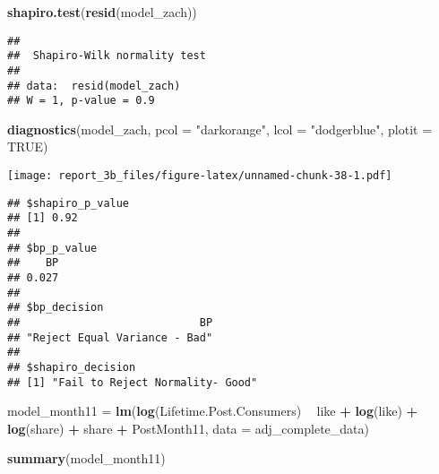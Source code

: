 \documentclass[
]{article}
\newenvironment{Shaded}{\begin{snugshade}}{\end{snugshade}}
\newcommand{\DataTypeTok}[1]{\textcolor[rgb]{0.13,0.29,0.53}{#1}}
\newcommand{\KeywordTok}[1]{\textcolor[rgb]{0.13,0.29,0.53}{\textbf{#1}}}
\newcommand{\NormalTok}[1]{#1}
\newcommand{\OperatorTok}[1]{\textcolor[rgb]{0.81,0.36,0.00}{\textbf{#1}}}
\newcommand{\OtherTok}[1]{\textcolor[rgb]{0.56,0.35,0.01}{#1}}
\newcommand{\StringTok}[1]{\textcolor[rgb]{0.31,0.60,0.02}{#1}}
\begin{document}
\begin{Shaded}
\begin{Highlighting}[]
\KeywordTok{shapiro.test}\NormalTok{(}\KeywordTok{resid}\NormalTok{(model_zach))}
\end{Highlighting}
\end{Shaded}

\begin{verbatim}
## 
##  Shapiro-Wilk normality test
## 
## data:  resid(model_zach)
## W = 1, p-value = 0.9
\end{verbatim}

\begin{Shaded}
\begin{Highlighting}[]
\KeywordTok{diagnostics}\NormalTok{(model_zach, }\DataTypeTok{pcol =} \StringTok{"darkorange"}\NormalTok{, }\DataTypeTok{lcol =} \StringTok{"dodgerblue"}\NormalTok{, }\DataTypeTok{plotit =} \OtherTok{TRUE}\NormalTok{)}
\end{Highlighting}
\end{Shaded}

\texttt{[image: report\_3b\_files/figure-latex/unnamed-chunk-38-1.pdf]}

\begin{verbatim}
## $shapiro_p_value
## [1] 0.92
## 
## $bp_p_value
##    BP 
## 0.027 
## 
## $bp_decision
##                            BP 
## "Reject Equal Variance - Bad" 
## 
## $shapiro_decision
## [1] "Fail to Reject Normality- Good"
\end{verbatim}

\begin{Shaded}
\begin{Highlighting}[]
\NormalTok{model_month11 =}\StringTok{ }\KeywordTok{lm}\NormalTok{(}\KeywordTok{log}\NormalTok{(Lifetime.Post.Consumers) }\OperatorTok{~}\StringTok{ }\NormalTok{like }\OperatorTok{+}\StringTok{ }\KeywordTok{log}\NormalTok{(like) }\OperatorTok{+}\StringTok{ }\KeywordTok{log}\NormalTok{(share) }\OperatorTok{+}\StringTok{ }\NormalTok{share }
                 \OperatorTok{+}\StringTok{ }\NormalTok{PostMonth11, }\DataTypeTok{data =}\NormalTok{ adj_complete_data)}

\KeywordTok{summary}\NormalTok{(model_month11)}
\end{Highlighting}
\end{Shaded}
\end{document}
